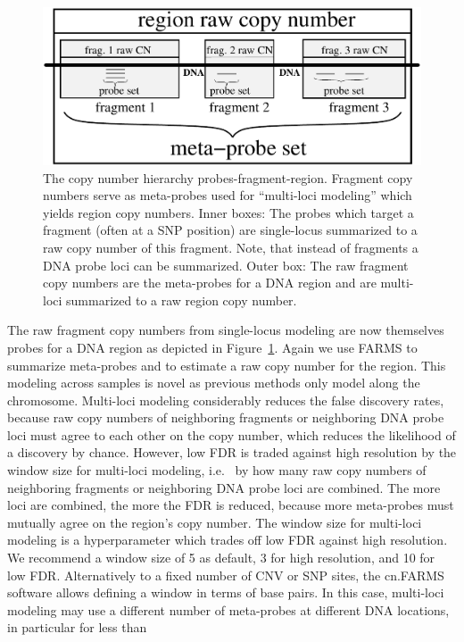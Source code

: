 \documentclass[article]{bioinf}
\begin{document}
\begin{figure}[t]
\begin{center}
\includegraphics[angle=0,width= 0.75\columnwidth]{figures/figure1}
\caption{The copy number hierarchy
probes-fragment-region. Fragment copy numbers serve as  
meta-probes used for ``multi-loci modeling'' which yields region copy numbers.
Inner boxes: The probes which target a fragment (often at a SNP
  position) are single-locus summarized to a raw copy number of this fragment.
Note, that instead of fragments a DNA probe loci can be summarized. Outer box: The
  raw fragment copy numbers are the meta-probes for a DNA
  region and are multi-loci summarized to a raw region copy number.
\label{fig:meta_probeset_fig}}
\end{center}
\end{figure} 
The raw fragment copy numbers from single-locus modeling are now themselves
probes for a DNA region as depicted in Figure~\ref{fig:meta_probeset_fig}.
Again we use FARMS to summarize meta-probes and
to estimate a raw copy number for the region. This modeling across 
samples is novel as previous methods only model along the chromosome. 
Multi-loci modeling considerably reduces
the false discovery rates, because raw copy numbers of
neighboring fragments or neighboring DNA probe loci must agree to each other 
on the copy number, which reduces the likelihood of a discovery by chance.
However, low FDR is traded against high resolution by 
the window size for multi-loci modeling, i.e.~
by how many raw copy numbers of neighboring fragments or neighboring
DNA probe loci are combined. 
The more loci are combined, the more the FDR is reduced, because more  
meta-probes must mutually agree on the region's copy number.
The window size for multi-loci modeling is 
a hyperparameter which trades off low FDR against high resolution. 
We recommend a window size of 5 as default, 3 for high
resolution, and 10 for low FDR.
Alternatively to a fixed number of CNV or
SNP sites, the cn.FARMS software allows defining a window in terms of base pairs.
In this case, multi-loci modeling may use a different number
of meta-probes at different DNA locations, in particular for less than
\end{document}
